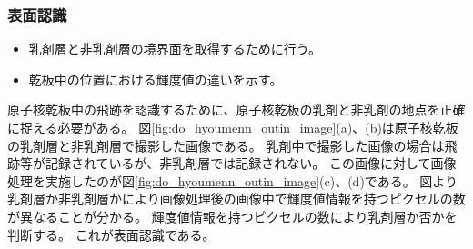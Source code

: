 \documentclass[12pt,a4paper]{jarticle}
\begin{document}
\subsubsection{表面認識}
\begin{itemize}
    \item 乳剤層と非乳剤層の境界面を取得するために行う。
    \item 乾板中の位置における輝度値の違いを示す。
\end{itemize}
原子核乾板中の飛跡を認識するために、原子核乾板の乳剤と非乳剤の地点を正確に捉える必要がある。
図\ref{fig:do_hyoumenn_outin_image}(a)、(b)は原子核乾板の乳剤層と非乳剤層で撮影した画像である。
乳剤中で撮影した画像の場合は飛跡等が記録されているが、非乳剤層では記録されない。
この画像に対して画像処理を実施したのが図\ref{fig:do_hyoumenn_outin_image}(c)、(d)である。
図より乳剤層か非乳剤層かにより画像処理後の画像中で輝度値情報を持つピクセルの数が異なることが分かる。
輝度値情報を持つピクセルの数により乳剤層か否かを判断する。
これが表面認識である。
\end{document}
